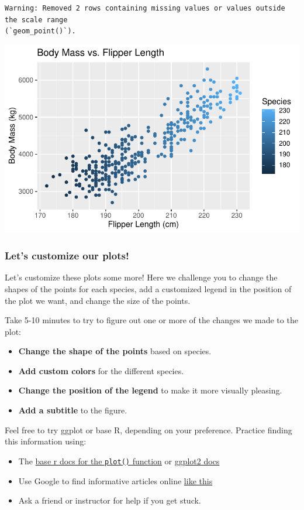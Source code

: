 \documentclass[
  letterpaper,
  DIV=11,
  numbers=noendperiod]{scrreprt}
\providecommand{\tightlist}{%
  \setlength{\itemsep}{0pt}\setlength{\parskip}{0pt}}\usepackage{longtable,booktabs,array}
\begin{document}
\begin{verbatim}
Warning: Removed 2 rows containing missing values or values outside the scale range
(`geom_point()`).
\end{verbatim}

\includegraphics{scripts/02_dataViz/class4_files/figure-pdf/local_aesthetics2-1.pdf}

\subsubsection{Let's customize our
plots!}\label{lets-customize-our-plots}

Let's customize these plots some more! Here we challenge you to change
the shapes of the points for each species, add a customized legend in
the position of the plot we want, and change the size of the points.

Take 5-10 minutes to try to figure out one or more of the changes we
made to the plot:

\begin{itemize}
\tightlist
\item
  \textbf{Change the shape of the points} based on species.
\item
  \textbf{Add custom colors} for the different species.
\item
  \textbf{Change the position of the legend} to make it more visually
  pleasing.
\item
  \textbf{Add a subtitle} to the figure.
\end{itemize}

Feel free to try ggplot or base R, depending on your preference.
Practice finding this information using:

\begin{itemize}
\item
  The \href{https://rdrr.io/r/base/plot.html}{base r docs for the
  \texttt{plot()} function} or
  \href{https://ggplot2.tidyverse.org/articles/ggplot2-specs.html}{ggplot2
  docs}
\item
  Use Google to find informative articles online
  \href{https://www.statology.org/ggplot-legend-position/}{like this}
\item
  Ask a friend or instructor for help if you get stuck.
\end{itemize}
\end{document}
